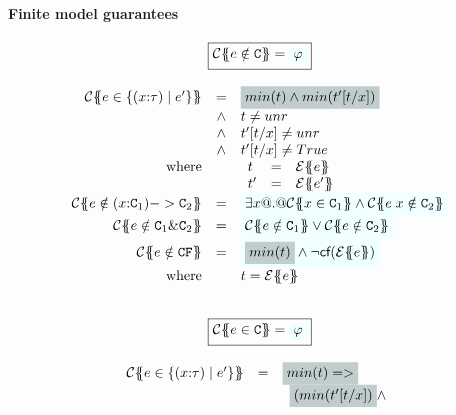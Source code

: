 \paragraph{Finite model guarantees}

\begin{figure}\small
\setlength{\arraycolsep}{2pt}
\[\begin{array}{c}
\ruleform{\ctrans{\Sigma}{\Gamma}{e \notin \Ct} = \formula{\phi}} \\ \\
\begin{array}{rcl}
\ctrans{\Sigma}{\Gamma}{e \in \{(x{:}\tau) \mid e' \}}
  & = & \highlight{min(t) \land min(t'[t/x])} \\
  & \land & t \neq \unr \\
  & \land & t'[t/x] \neq \unr \\
  & \land & t'[t/x] \neq True \\
 \mbox{where} &  &
    \begin{array}[t]{lcl}
      t  & = & \etrans{\Sigma}{\Gamma}{e} \\
      t' & = & \etrans{\Sigma}{\Gamma}{e'}
    \end{array}
\\
\ctrans{\Sigma}{\Gamma}{e \notin (x{:}\Ct_1) -> \Ct_2}
  & = & \formula{\exists x @.@ \ctrans{\Sigma}{\Gamma,x}{x \in \Ct_1}
                          \land \ctrans{\Sigma}{\Gamma,x}{e\;x \notin \Ct_2}}
\\
\ctrans{\Sigma}{\Gamma}{e \notin \Ct_1 \& \Ct_2}
   & = & \formula{ \ctrans{\Sigma}{\Gamma}{e \notin \Ct_1} \lor
                   \ctrans{\Sigma}{\Gamma}{e \notin \Ct_2}}
\\
\ctrans{\Sigma}{\Gamma}{e \notin \CF} & = & \formula{\highlight{min(t)} \land
                                               \neg\lcf{\etrans{\Sigma}{\Gamma}{e}}} \\
\mbox{where}  &  & t = \etrans{\Sigma}{\Gamma}{e} \\ \\
\end{array} \\ \\
\ruleform{\ctrans{\Sigma}{\Gamma}{e \in \Ct} = \formula{\phi}} \\ \\
\begin{array}{rcl}
\ctrans{\Sigma}{\Gamma}{e \in \{(x{:}\tau) \mid e' \}}
  & = & \highlight{min(t) => }  \\
  &   & \begin{array}[t]{l} \highlight{(min(t'[t/x])} \land \\

\end{array}
\end{array}
\end{array}\]
\end{figure}
